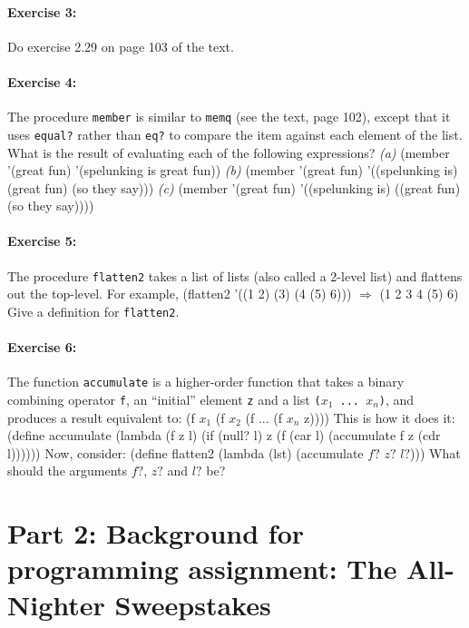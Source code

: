 \paragraph{Exercise 3:}

Do exercise 2.29 on page 103 of the text.

\paragraph{Exercise 4:}

The procedure {\tt member} is similar to {\tt memq} (see the text, page 102),
except that it uses {\tt equal?} rather than {\tt eq?} to compare the item
against each element of the list.  What is the result of evaluating each of
the following expressions?
 \beginlisp
{\it (a)\/}    (member '(great fun) '(spelunking is great fun))
{\it (b)\/}    (member '(great fun) '((spelunking is) (great fun) (so they say)))
{\it (c)\/}    (member '(great fun) '((spelunking is) ((great fun) (so they say))))
 \endlisp

\paragraph{Exercise 5:}

The procedure {\tt flatten2} takes a list of lists (also called a 2-level list)
and flattens out the top-level.  For example,
 \beginlisp
(flatten2 '((1 2) (3) (4 (5) 6))) $\Rightarrow$ (1 2 3 4 (5) 6)
 \endlisp
 Give a definition for {\tt flatten2}.

\paragraph{Exercise 6:}

The function {\tt accumulate} is a higher-order function that takes a binary
combining operator {\tt f}, an ``initial'' element {\tt z} and a list
\mbox{\tt ($x_1$ ... $x_n$)}, and produces a result equivalent to:
 \beginlisp
(f $x_1$ (f $x_2$ (f ... (f $x_n$ z))))
 \endlisp
This is how it does it:
 \beginlisp
(define accumulate
  (lambda (f z l)
    (if (null? l)
        z
        (f (car l) (accumulate f z (cdr l))))))
 \endlisp
 Now, consider:
 \beginlisp
(define flatten2
  (lambda (lst)
     (accumulate $f?$ $z?$ $l?$)))
 \endlisp
 What should the arguments $f?$, $z?$ and $l?$ be?


\section{Part 2: Background for programming assignment: The All-Nighter
Sweepstakes}

